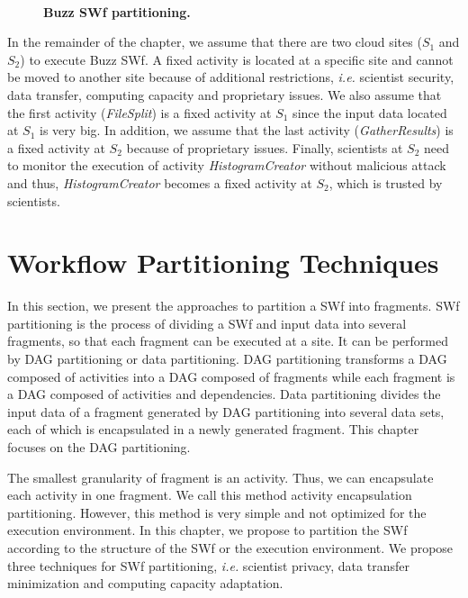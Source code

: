 \begin{figure}
\begin{centering}
		\\
	\end{centering}
\caption{\textbf{Buzz SWf partitioning. }}
\label{fig:f1} 
\end{figure}

In the remainder of the chapter, we assume that there are two cloud sites (\textit{$S_{1}$} and \textit{$S_{2}$}) to execute Buzz SWf.
A fixed activity is located at a specific site and cannot be moved to another site because of additional restrictions, 
\textit{i.e.} scientist security, data transfer, computing capacity and proprietary issues.
We also assume that the first activity (\textit{FileSplit}) is a fixed activity at \textit{$S_{1}$} since the input data located at \textit{$S_{1}$} is very big. 
In addition, we assume that the last activity (\textit{GatherResults}) is a fixed activity at \textit{$S_{2}$} because of proprietary issues. 
Finally, scientists at \textit{$S_{2}$} need to monitor the execution of activity \textit{HistogramCreator} without malicious attack
and thus, \textit{HistogramCreator} becomes a fixed activity at \textit{$S_{2}$}, which is trusted by scientists.

\section{Workflow Partitioning Techniques}
\label{sec:WPT}

In this section, we present the approaches to partition a SWf into fragments.
SWf partitioning is the process of dividing a SWf and input data into several fragments, so that each fragment can be executed at a site. It can be performed by DAG partitioning or data partitioning. DAG partitioning transforms a DAG composed of activities into a DAG composed of fragments while each fragment is a DAG composed of activities and dependencies. Data partitioning divides the input data of a fragment generated by DAG partitioning into several data sets, each of which is encapsulated in a newly generated fragment. This chapter focuses on the DAG partitioning.

The smallest granularity of fragment is an activity. Thus, we can encapsulate each activity in one fragment. 
We call this method activity encapsulation partitioning. 
However, this method is very simple and not optimized for the execution environment. 
In this chapter, we propose to partition the SWf according to the structure of the SWf or the execution environment.
We propose three techniques for SWf partitioning, \textit{i.e.} scientist privacy, 
data transfer minimization and computing capacity adaptation. 

